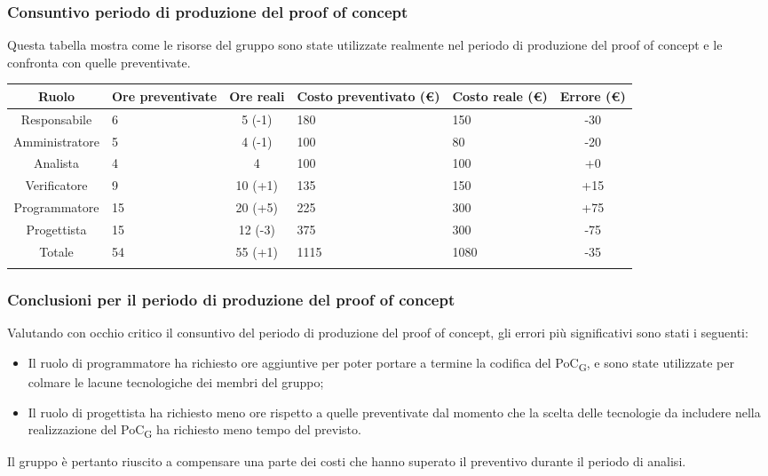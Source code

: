 \subsubsection{Consuntivo periodo di produzione del proof of concept}
Questa tabella mostra come le risorse del gruppo sono state utilizzate realmente nel periodo di produzione del proof of concept e le confronta con quelle preventivate.

\setlength\extrarowheight{5pt}
\begin{tabularx}{\textwidth}{|c|XcXX|c|}
	\hline
	\rowcolor{white}
	\textbf{Ruolo} & \textbf{Ore preventivate} & \textbf{Ore reali} & \textbf{Costo preventivato (€)} & \textbf{Costo reale (€)} & \textbf{Errore (€)} \\
	\hline
	Responsabile &6&5 (-1)&180&150&-30\\
	Amministratore &5&4 (-1)&100&80&-20\\
	Analista &4&4&100&100&+0\\
	Verificatore &9&10 (+1)&135&150&+15\\
	Programmatore &15&20 (+5)&225&300&+75\\
	Progettista &15&12 (-3)&375&300&-75\\
	\hline
	Totale &54&55 (+1)&1115&1080&-35\\
	\hline
	\rowcolor{white}
	\caption{Consuntivo ore e costi per ruolo durante il periodo di produzione del proof of concept}
\end{tabularx}

\subsubsection{Conclusioni per il periodo di produzione del proof of concept}


Valutando con occhio critico il consuntivo del periodo di produzione del proof of concept, gli errori più significativi sono stati i seguenti:
\begin{itemize}
	\item Il ruolo di programmatore ha richiesto ore aggiuntive per poter portare a termine la codifica del PoC\textsubscript{G}, e sono state utilizzate per colmare le lacune tecnologiche dei membri del gruppo;
    \item Il ruolo di progettista ha richiesto meno ore rispetto a quelle preventivate dal momento che la scelta delle tecnologie  da includere nella realizzazione del PoC\textsubscript{G} ha richiesto meno tempo del previsto.
\end{itemize}
Il gruppo è pertanto riuscito a compensare una parte dei costi che hanno superato il preventivo durante il periodo di analisi.

